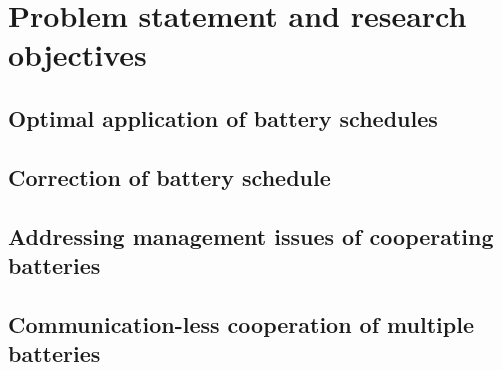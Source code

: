 \section{Problem statement and research objectives}
\label{ch-introduction:sec:problem-statement}




\subsection{Optimal application of battery schedules}

\subsection{Correction of battery schedule}

\subsection{Addressing management issues of cooperating batteries}

\subsection{Communication-less cooperation of multiple batteries}